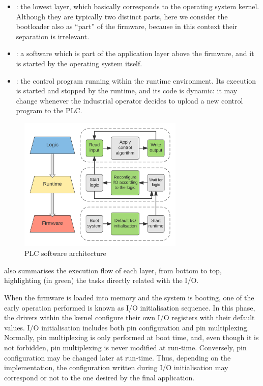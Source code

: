 \begin{itemize}
	\item {}: the lowest layer, which basically corresponds to the operating system kernel. Although they are typically two distinct parts,
		here we consider the bootloader also as ``part'' of the firmware, because in this context their separation is irrelevant.
	\item {}: a software which is part of the application layer above the firmware, and it is started by the operating system itself.
	\item {}: the control program running within the runtime environment. Its execution is started and stopped by the runtime,
		and its code is dynamic: it may change whenever the industrial operator decides to upload a new control program to the PLC.
\end{itemize}

\begin{figure}[h]
\centerline{\includegraphics[width=0.7\textwidth]{res/plc-swarch}}
\caption{PLC software architecture \label{fig:plc-swarch}}
\end{figure}

 also summarises the execution flow of each layer, from bottom to top, highlighting (in green) the tasks directly related with the I/O.

When the firmware is loaded into memory and the system is booting, one of the early operation performed is known as I/O initialisation sequence.
In this phase, the drivers within the kernel configure their own I/O registers with their default values.
I/O initialisation includes both pin configuration and pin multiplexing. Normally, pin multiplexing is only performed at boot time, and, even though it is not forbidden,
pin multiplexing is never modified at run-time. Conversely, pin configuration may be changed later at run-time. Thus, depending on the implementation, the configuration
written during I/O initialisation may correspond or not to the one desired by the final application.

